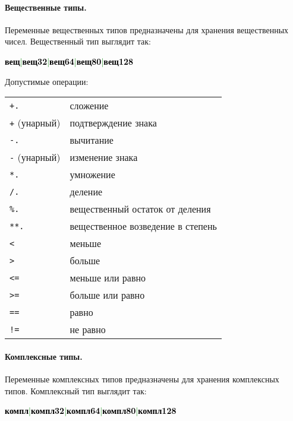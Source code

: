 \documentclass[10pt]{report}
\begin{document}
            \paragraph{Вещественные типы.}Переменные вещественных типов предназначены для хранения вещественных чисел. Вещественный тип выглядит так:
\begin{center}
\noindent\textcolor{Green}{\textcolor{Black}{\textbf{вещ}}|\textcolor{Black}{\textbf{вещ32}}|\textcolor{Black}{\textbf{вещ64}}|\textcolor{Black}{\textbf{вещ80}}|\textcolor{Black}{\textbf{вещ128}}}
\end{center}

Допустимые операции:
\begin{longtable}{ll}
\texttt{+.}             & сложение                                          \\
\texttt{+} (унарный)    & подтверждение знака                               \\
\texttt{-.}             & вычитание                                         \\
\texttt{-} (унарный)    & изменение знака                                   \\
\texttt{*.}             & умножение                                         \\
\texttt{/.}             & деление                                           \\
\texttt{\%.}            & вещественный остаток от деления                   \\
\texttt{**.}            & вещественное возведение в степень                 \\
\texttt{<}              & меньше                                            \\
\texttt{>}              & больше                                            \\
\texttt{<=}             & меньше или равно                                  \\
\texttt{>=}             & больше или равно                                  \\
\texttt{==}             & равно                                             \\
\texttt{!=}             & не равно                                          \\
\end{longtable}

            \paragraph{Комплексные типы.}Переменные комплексных типов предназначены для хранения комплексных типов. Комплексный тип выглядит так:
\begin{center}
\noindent\textcolor{Green}{\textcolor{Black}{\textbf{компл}}|\textcolor{Black}{\textbf{компл32}}|\textcolor{Black}{\textbf{компл64}}|\textcolor{Black}{\textbf{компл80}}|\textcolor{Black}{\textbf{компл128}}}
\end{center}
\end{document}
